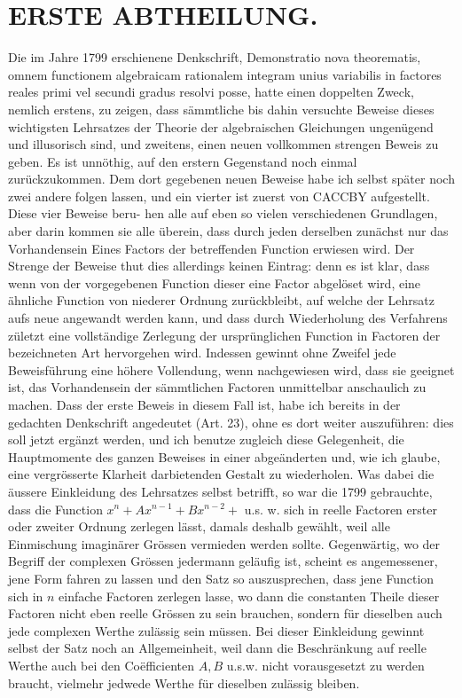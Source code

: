 \documentclass[twoside,12pt, showframe]{memoir}
\begin{document}
\section*{ERSTE ABTHEILUNG.}
Die im Jahre 1799 erschienene Denkschrift, Demonstratio nova theorematis, omnem functionem algebraicam rationalem integram unius variabilis in factores reales primi vel secundi gradus resolvi posse, hatte einen doppelten Zweck, nemlich erstens, zu zeigen, dass sämmtliche bis dahin versuchte Beweise dieses wichtigsten Lehrsatzes der Theorie der algebraischen Gleichungen ungenügend und illusorisch sind, und zweitens, einen neuen vollkommen strengen Beweis zu geben. Es ist unnöthig, auf den erstern Gegenstand noch einmal zurückzukommen. Dem dort gegebenen neuen Beweise habe ich selbst später noch zwei andere folgen lassen, und ein vierter ist zuerst von CACCBY aufgestellt. Diese vier Beweise beru-
hen alle auf eben so vielen verschiedenen Grundlagen, aber darin kommen sie alle überein, dass durch jeden derselben zunächst nur das Vorhandensein Eines Factors der betreffenden Function erwiesen wird. Der Strenge der Beweise thut dies allerdings keinen Eintrag: denn es ist klar, dass wenn von der vorgegebenen Function dieser eine Factor abgelöset wird, eine ähnliche Function von niederer Ordnung zurückbleibt, auf welche der Lehrsatz aufs neue angewandt werden kann, und dass durch Wiederholung des Verfahrens zületzt eine vollständige Zerlegung der ursprünglichen Function in Factoren der bezeichneten Art hervorgehen wird. Indessen gewinnt ohne Zweifel jede Beweisführung eine höhere Vollendung, wenn nachgewiesen wird, dass sie geeignet ist, das Vorhandensein der sämmtlichen Factoren unmittelbar anschaulich zu machen. Dass der erste Beweis in diesem Fall ist, habe ich bereits in der gedachten Denkschrift angedeutet (Art. 23), ohne es dort weiter auszuführen: dies soll jetzt ergänzt werden, und ich benutze zugleich diese Gelegenheit, die Hauptmomente des ganzen Beweises in einer abgeänderten und, wie ich glaube, eine vergrösserte Klarheit darbietenden Gestalt zu wiederholen. Was dabei die äussere Einkleidung des Lehrsatzes selbst betrifft, so war die 1799 gebrauchte, dass die Function \(x^{n}+A x^{n-1}+B x^{n-2}+\) u.s. w. sich in reelle Factoren erster oder zweiter Ordnung zerlegen lässt, damals deshalb gewählt, weil alle Einmischung imaginärer Grössen vermieden werden sollte. Gegenwärtig, wo der Begriff der complexen Grössen jedermann geläufig ist, scheint es angemessener, jene Form fahren zu lassen und den Satz so auszusprechen, dass jene Function sich in \(n\) einfache Factoren zerlegen lasse, wo dann die constanten Theile dieser Factoren nicht eben reelle Grössen zu sein brauchen, sondern für dieselben auch jede complexen Werthe zulässig sein müssen. Bei dieser Einkleidung gewinnt selbst der Satz noch an Allgemeinheit, weil dann die Beschränkung auf reelle Werthe auch bei den Coëfficienten \(A, B\) u.s.w. nicht vorausgesetzt zu werden braucht, vielmehr jedwede Werthe für dieselben zulässig bleiben.
\end{document}

